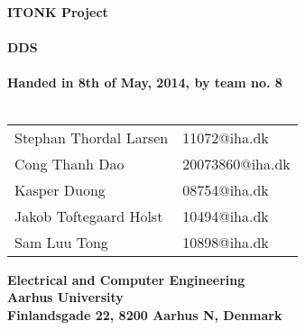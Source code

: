 \begin{titlepage}
\begin{center}
{\LARGE \textbf{ITONK Project}}\\~\\
{\LARGE \textbf{DDS}}\\~\\
\textbf{Handed in 8th of May, 2014, by team no. 8}\\~\\
\begin{tabular}{ll}
Stephan Thordal Larsen & 11072@iha.dk \\
Cong Thanh Dao & 20073860@iha.dk \\
Kasper Duong & 08754@iha.dk \\
Jakob Toftegaard Holst & 10494@iha.dk \\
Sam Luu Tong & 10898@iha.dk \\
\end{tabular}
\vfill
\textbf{Electrical and Computer Engineering}\\
\textbf{Aarhus University}\\
\textbf{Finlandsgade 22, 8200 Aarhus N, Denmark}
\end{center}
\end{titlepage} 